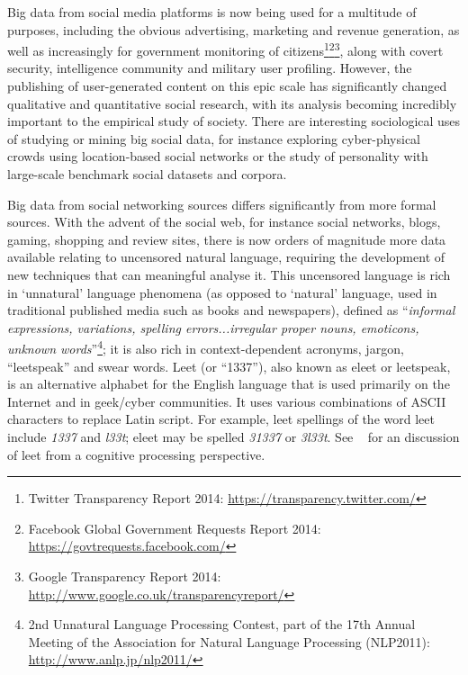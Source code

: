 \documentclass[letterpaper]{article}
\begin{document}
Big data from social media platforms is now being used for a multitude
of purposes, including the obvious advertising, marketing and revenue
generation, as well as increasingly for government monitoring of
citizens\footnote{Twitter Transparency Report 2014:
\url{https://transparency.twitter.com/}}\footnote{Facebook Global
Government Requests Report
2014:\\\url{https://govtrequests.facebook.com/}}\footnote{Google
Transparency Report
2014:\\\url{http://www.google.co.uk/transparencyreport/}}, along with
covert security, intelligence community and military user profiling.
However, the publishing of user-generated content on this epic scale
has significantly changed qualitative and quantitative social
research, with its analysis becoming incredibly important to the
empirical study of society. There are interesting sociological uses of
studying or mining big social data, for instance exploring
cyber-physical crowds using location-based social networks or the
study of personality with large-scale benchmark social datasets and
corpora.

Big data from social networking sources differs significantly from
more formal sources.  With the advent of the social web, for instance
social networks, blogs, gaming, shopping and review sites, there is
now orders of magnitude more data available relating to uncensored
natural language, requiring the development of new techniques that can
meaningful analyse it. This uncensored language is rich in `unnatural'
language phenomena (as opposed to `natural' language, used in
traditional published media such as books and newspapers), defined as
``{\emph{informal expressions, variations, spelling errors...irregular
proper nouns, emoticons, unknown words}}''\footnote{2nd Unnatural
Language Processing Contest, part of the 17th Annual Meeting of the
Association for Natural Language Processing (NLP2011):
\url{http://www.anlp.jp/nlp2011/}}; it is also rich in
context-dependent acronyms, jargon, ``leetspeak'' and swear
words. Leet (or ``1337''), also known as eleet or leetspeak, is an
alternative alphabet for the English language that is used primarily
on the Internet and in geek/cyber communities. It uses various
combinations of ASCII characters to replace Latin script. For example,
leet spellings of the word leet include {\emph{1337}} and
{\emph{l33t}}; eleet may be spelled {\emph{31337}} or
{\emph{3l33t}}. See
\citeauthor{perea-et-al:2008}~ for an
discussion of leet from a cognitive processing perspective.
\end{document}
